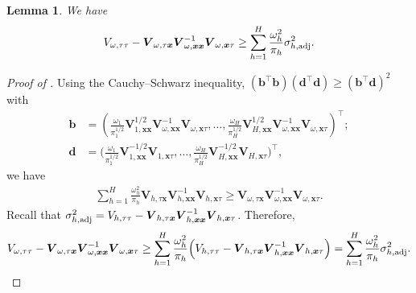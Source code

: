 \documentclass[12pt]{article}
\newtheorem{lemma}{Lemma}
\newcommand{\adj}{\textnormal{adj}}
\newcommand{\bs}{\boldsymbol}
\begin{document}
\begin{lemma}
\label{lem:V-omega-positive}
We have
    \[
V_{\omega,\tau\tau} - 
\bs{V}_{\omega,\tau\bs{x}}\bs{V}_{\omega,\bs{x}\bs{x}}^{-1}\bs{V}_{\omega,\bs{x}\tau} \geq  \sum_{h=1}^H \frac{\omega_h^2}{\pi_{h}} \sigma^2_{h,\adj}.
    \]
\end{lemma}
\begin{proof}[Proof of ]
    Using the Cauchy--Schwarz inequality, $(\bs{b}^\top\bs{b})(\bs{d}^\top\bs{d}) \geq (\bs{b}^\top\bs{d})^2$ with 
    \begin{align*}
        \bs{b} &= (\frac{\omega_1}{\pi_{1}^{1/2}}\bs{V}_{1, \bs{x}\bs{x}}^{1/2}\bs{V}_{\omega,\bs{x}\bs{x}}^{-1}\bs{V}_{\omega,\bs{x}\tau}, \ldots, \frac{\omega_H}{\pi_{H}^{1/2}}\bs{V}_{H, \bs{x}\bs{x}}^{1/2}\bs{V}_{\omega,\bs{x}\bs{x}}^{-1}\bs{V}_{\omega,\bs{x}\tau})^\top;\\
        \bs{d} &= \Big(\frac{\omega_1}{\pi_{1}^{1/2}}\bs{V}_{1, \bs{x}\bs{x}}^{-1/2}\bs{V}_{1,\bs{x}\tau}, \ldots, \frac{\omega_H}{\pi_{H}^{1/2}}\bs{V}_{H, \bs{x}\bs{x}}^{-1/2}\bs{V}_{H,\bs{x}\tau}\Big)^\top,
    \end{align*}
we have
\begin{align*}
 \sum_{h=1}^H \frac{\omega_h^2}{\pi_{h}}\bs{V}_{h,\tau\bs{x}}\bs{V}_{h,\bs{x}\bs{x}}^{-1}\bs{V}_{h,\bs{x}\tau} \geq \bs{V}_{\omega,\tau\bs{x}}\bs{V}_{\omega,\bs{x}\bs{x}}^{-1}\bs{V}_{\omega,\bs{x}\tau}.
\end{align*}
Recall that
    $\sigma^2_{h, \adj} = V_{h,\tau\tau}- \bs{V}_{h,\tau\bs{x}}\bs{V}_{h,\bs{x}\bs{x}}^{-1}\bs{V}_{h,\bs{x}\tau}$.
Therefore, 
\begin{align*}
 V_{\omega,\tau\tau} - \bs{V}_{\omega,\tau\bs{x}}\bs{V}_{\omega,\bs{x}\bs{x}}^{-1}\bs{V}_{\omega,\bs{x}\tau} \geq  \sum_{h=1}^H \frac{\omega_h^2}{\pi_{h}} \Big(V_{h,\tau\tau} -\bs{V}_{h,\tau\bs{x}}\bs{V}_{h,\bs{x}\bs{x}}^{-1}\bs{V}_{h,\bs{x}\tau}\Big) = \sum_{h=1}^H \frac{\omega_h^2}{\pi_{h}} \sigma^2_{h,\adj}.
\end{align*}
\end{proof}
\end{document}
